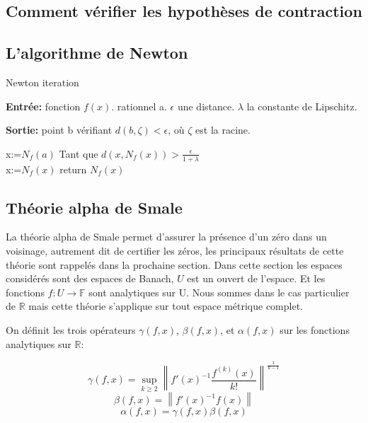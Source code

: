 \documentclass[a4paper,10.5pt]{article}
\begin{document}
	\subsection{Comment vérifier les hypothèses de contraction} 
	
	\subsection{L'algorithme de Newton}
	
	
	
	\begin{algorithm}
		\caption{Newton iteration}
		
		\vspace{2mm}
		
		\textbf{Entrée:} fonction $f(x)$. rationnel a. $\epsilon$ une distance. $\lambda$ la constante de Lipschitz.
		
		\textbf{Sortie:} point b vérifiant $d(b,\zeta)<\epsilon$, où $\zeta$ est la racine. 
		
		\begin{algorithmic}[1]
			\STATE x:=$N_{f}(a)$
			\STATE Tant que $d(x,N_{f}(x))>\frac{\epsilon}{1+\lambda}$\\
					x:=$N_{f}(x)$					
			\STATE return $N_{f}(x)$
		\end{algorithmic}
	\end{algorithm}

	\subsection{Théorie alpha de Smale}
	La théorie alpha de Smale permet d'assurer la présence d'un zéro dans un voisinage, autrement dit de certifier les zéros, les principaux résultats de cette théorie sont rappelés dans la prochaine section.
	Dans cette section les espaces considérés sont des espaces de Banach, $U$ est un ouvert de l'espace. Et les fonctions $f:U\rightarrow \mathbb{F}$ sont analytiques sur U. Nous sommes dans le cas particulier de $\mathbb{R}$ mais cette théorie s'applique sur tout espace métrique complet. 
	
	\begin{definition}
		
		On définit les trois opérateurs $\gamma(f,x)$, $\beta(f,x)$, et $\alpha(f,x)$ sur les fonctions analytiques sur $\mathbb{R}$:
		
		\[\gamma(f,x)=\sup_{k \geq 2}\left\|f'(x)^{-1}\frac{f^{(k)}(x)}{k!}\right\|^{\frac{1}{k-1}}\]
		\[\beta(f,x)=\left\|f'(x)^{-1}f(x)\right\|\]
		\[\alpha(f,x)=\gamma(f,x)\beta(f,x)\]
	\end{definition}
	
\end{document}
